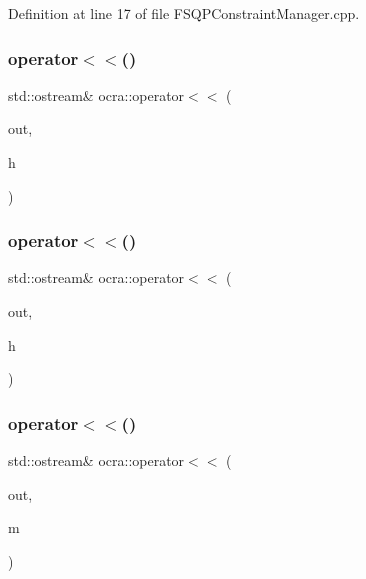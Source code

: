 Definition at line 17 of file F\+S\+Q\+P\+Constraint\+Manager.\+cpp.

\hypertarget{namespaceocra_a1a3b81827cc00a5d60d7b291760a2c24}{}\label{namespaceocra_a1a3b81827cc00a5d60d7b291760a2c24} 
\subsubsection{\texorpdfstring{operator$<$$<$()}{operator<<()}\hspace{0.1cm}{\footnotesize\ttfamily [1/6]}}
{\footnotesize\ttfamily std\+::ostream\& ocra\+::operator$<$$<$ (\begin{DoxyParamCaption}\item[{std\+::ostream \&}]{out,  }\item[{const \hyperlink{structocra_1_1HierarchyLevel}{Hierarchy\+Level} \&}]{h }\end{DoxyParamCaption})}

\hypertarget{namespaceocra_a32e98e3aa2f08382b40856002969589e}{}\label{namespaceocra_a32e98e3aa2f08382b40856002969589e} 
\subsubsection{\texorpdfstring{operator$<$$<$()}{operator<<()}\hspace{0.1cm}{\footnotesize\ttfamily [2/6]}}
{\footnotesize\ttfamily std\+::ostream\& ocra\+::operator$<$$<$ (\begin{DoxyParamCaption}\item[{std\+::ostream \&}]{out,  }\item[{const \hyperlink{structocra_1_1HierarchyLevel__barre}{Hierarchy\+Level\+\_\+barre} \&}]{h }\end{DoxyParamCaption})}

\hypertarget{namespaceocra_a8e1107e277e275155b0762fd2ab2fc98}{}\label{namespaceocra_a8e1107e277e275155b0762fd2ab2fc98} 
\subsubsection{\texorpdfstring{operator$<$$<$()}{operator<<()}\hspace{0.1cm}{\footnotesize\ttfamily [3/6]}}
{\footnotesize\ttfamily std\+::ostream\& ocra\+::operator$<$$<$ (\begin{DoxyParamCaption}\item[{std\+::ostream \&}]{out,  }\item[{const \hyperlink{structocra_1_1MatrixPQ}{Matrix\+PQ} \&}]{m }\end{DoxyParamCaption})}

